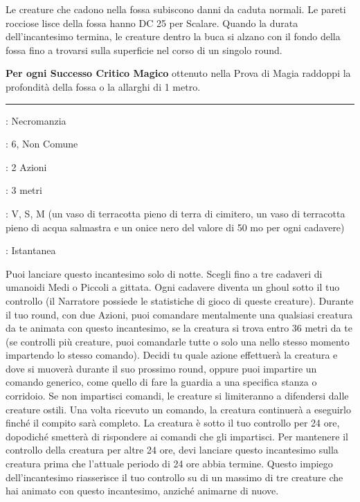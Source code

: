 \begin{multicols}{2}
Le creature che cadono nella fossa subiscono danni da caduta normali. Le pareti rocciose lisce della fossa hanno DC 25 per Scalare. Quando la durata dell'incantesimo termina, le creature dentro la buca si alzano con il fondo della fossa fino a trovarsi sulla superficie nel corso di un singolo round.

\textbf{Per ogni Successo Critico Magico} ottenuto nella Prova di Magia raddoppi la profondità della fossa o la allarghi di 1 metro.

\smallskip\noindent\rule{\linewidth}{2pt} \hypertarget{Creare Non Morti}{}\smallskip{}
\noindent
\begin{description}[noitemsep, topsep=0pt, parsep=0pt, partopsep=0pt, leftmargin=0cm, labelwidth=2.8cm]
	\item[\textbf{Lista di Magia}]: Necromanzia
	\item[\textbf{Livello}]: 6, Non Comune
	\item[\textbf{T. di Lancio}]: 2 Azioni
	\item[\textbf{Gittata}]: 3 metri
	\item[\textbf{Componenti}]: V, S, M (un vaso di terracotta pieno di terra di cimitero, un vaso di terracotta pieno di acqua salmastra e un onice nero del valore di 50 mo per ogni cadavere)
	\item[\textbf{Durata}]: Istantanea
\end{description}

Puoi lanciare questo incantesimo solo di notte. Scegli fino a tre cadaveri di umanoidi Medi o Piccoli a gittata. Ogni cadavere diventa un ghoul sotto il tuo controllo (il Narratore possiede le statistiche di gioco di queste creature). Durante il tuo round, con due Azioni, puoi comandare mentalmente una qualsiasi creatura da te animata con questo incantesimo, se la creatura si trova entro 36 metri da te (se controlli più creature, puoi comandarle tutte o solo una nello stesso momento impartendo lo stesso comando). Decidi tu quale azione effettuerà la creatura e dove si muoverà durante il suo prossimo round, oppure puoi impartire un comando generico, come quello di fare la guardia a una specifica stanza o corridoio. Se non impartisci comandi, le creature si limiteranno a difendersi dalle creature ostili. Una volta ricevuto un comando, la creatura continuerà a eseguirlo finché il compito sarà completo. La creatura è sotto il tuo controllo per 24 ore, dopodiché smetterà di rispondere ai comandi che gli impartisci. Per mantenere il controllo della creatura per altre 24 ore, devi lanciare questo incantesimo sulla creatura prima che l'attuale periodo di 24 ore abbia termine. Questo impiego dell'incantesimo riasserisce il tuo controllo su di un massimo di tre creature che hai animato con questo incantesimo, anziché animarne di nuove.


\end{multicols}
